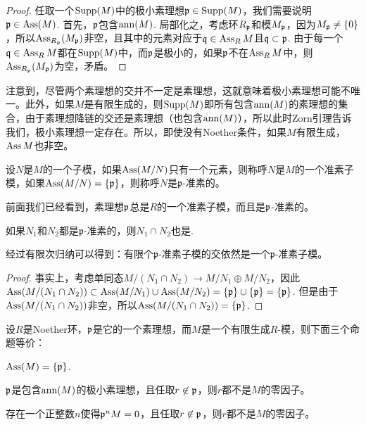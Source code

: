 \begin{proof}
任取一个$\operatorname{Supp}(M)$中的极小素理想$\mathfrak{p}\in \operatorname{Supp}(M)$，我们需要说明$\mathfrak{p}\in \operatorname{Ass}(M)$. 首先，$\mathfrak{p}$包含$\operatorname{ann}(M)$. 局部化之，考虑环$R_{\mathfrak{p}}$和模$M_{\mathfrak{p}}$，因为$M_{\mathfrak{p}}\neq \{0\}$，所以$\operatorname{Ass}_{R_{\mathfrak{p}}}(M_{\mathfrak{p}})$非空，且其中的元素对应于$\mathfrak{q}\in \operatorname{Ass}_R M$且$\mathfrak{q}\subset \mathfrak{p}$. 由于每一个$\mathfrak{q}\in \operatorname{Ass}_R M$都在$\operatorname{Supp}(M)$中，而$\mathfrak{p}$是极小的，如果$\mathfrak{p}$不在$\operatorname{Ass}_R M$中，则$\operatorname{Ass}_{R_{\mathfrak{p}}}(M_{\mathfrak{p}})$为空，矛盾。
\end{proof}

注意到，尽管两个素理想的交并不一定是素理想，这就意味着极小素理想可能不唯一。此外，如果$M$是有限生成的，则$\operatorname{Supp}(M)$即所有包含$\operatorname{ann}(M)$的素理想的集合，由于素理想降链的交还是素理想（也包含$\operatorname{ann}(M)$），所以此时Zorn引理告诉我们，极小素理想一定存在。所以，即使没有Noether条件，如果$M$有限生成，$\operatorname{Ass} M$也非空。

\begin{para}
设$N$是$M$的一个子模，如果$\operatorname{Ass}(M/N)$只有一个元素，则称呼$N$是$M$的一个准素子模，如果$\operatorname{Ass}(M/N)=\{\mathfrak{p}\}$，则称呼$N$是$\mathfrak{p}$-准素的。
\end{para}

前面我们已经看到，素理想$\mathfrak{p}$总是$R$的一个准素子模，而且是$\mathfrak{p}$-准素的。

\begin{lem}
	如果$N_1$和$N_2$都是$\mathfrak{p}$-准素的，则$N_1\cap N_2$也是. 
\end{lem}

经过有限次归纳可以得到：有限个$\mathfrak{p}$-准素子模的交依然是一个$\mathfrak{p}$-准素子模。

\begin{proof}
	事实上，考虑单同态$M/(N_1\cap N_2)\to M/N_1\oplus M/N_2$，因此$\operatorname{Ass}(M/(N_1\cap N_2))\subset \operatorname{Ass}(M/N_1)\cup \operatorname{Ass}(M/N_2)=\{\mathfrak{p}\}\cup \{\mathfrak{p}\}=\{\mathfrak{p}\}$. 但是由于$\operatorname{Ass}(M/(N_1\cap N_2))$非空，所以$\operatorname{Ass}(M/(N_1\cap N_2))=\{\mathfrak{p}\}$. 
\end{proof}

\begin{pro}\label{pro:5.1.11}
设$R$是Noether环，$\mathfrak{p}$是它的一个素理想，而$M$是一个有限生成$R$-模，则下面三个命题等价：
\begin{compactenum}[~~~(1)]
\item $\operatorname{Ass}(M)=\{\mathfrak{p}\}$.
\item $\mathfrak{p}$是包含$\operatorname{ann}(M)$的极小素理想，且任取$r\not\in \mathfrak{p}$，则$r$都不是$M$的零因子。
\item 存在一个正整数$n$使得$\mathfrak{p}^n M=0$，且任取$r\not\in \mathfrak{p}$，则$r$都不是$M$的零因子。
\end{compactenum}
\end{pro}

